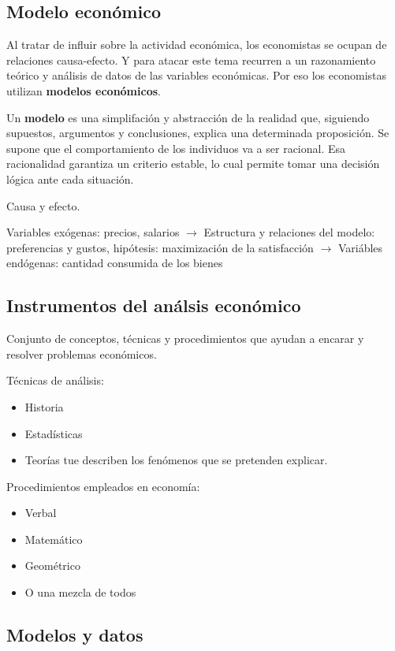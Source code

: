 \subsection{Modelo económico}

Al tratar de influir sobre la actividad económica,
los economistas se ocupan de relaciones causa-efecto.
Y para atacar este tema recurren a un razonamiento teórico
y análisis de datos de las variables económicas.
Por eso los economistas utilizan \textbf{modelos económicos}.

Un \textbf{modelo} es una simplifación y abstracción de la realidad que,
siguiendo supuestos, argumentos y conclusiones,
explica una determinada proposición.
Se supone que el comportamiento de los individuos va a ser racional.
Esa racionalidad garantiza un criterio estable,
lo cual permite tomar una decisión lógica ante cada situación.

Causa y efecto.

Variables exógenas: precios, salarios \(\to\) Estructura y relaciones del modelo: preferencias y gustos, hipótesis: maximización de la satisfacción \(\to\) Variábles endógenas: cantidad consumida de los bienes

\subsection{Instrumentos del análsis económico}

Conjunto de conceptos, técnicas y procedimientos que ayudan a encarar y resolver problemas económicos.

Técnicas de análisis:
\begin{itemize}
    \item Historia
    \item Estadísticas
    \item Teorías tue describen los fenómenos que se pretenden explicar.
\end{itemize}

Procedimientos empleados en economía:
\begin{itemize}
    \item Verbal
    \item Matemático
    \item Geométrico
    \item O una mezcla de todos
\end{itemize}

\subsection{Modelos y datos}

